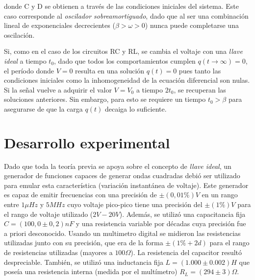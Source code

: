 \documentclass[11pt,a4paper]{article}
\begin{document}
donde C y D se obtienen a través de las condiciones iniciales del sistema. Este caso corresponde al \textit{oscilador sobreamortiguado}, dado que al ser una combinación lineal de exponenciales decrecientes ($\beta > \omega > 0$) nunca puede completarse una oscilación. 

Si, como en el caso de los circuitos RC y RL, se cambia el voltaje con una \textit{llave ideal} a tiempo $t_0$, dado que todos los comportamientos cumplen $q(t\rightarrow\infty) = 0$, el período donde $V = 0$ resulta en una solución $q(t) = 0$ pues tanto las condiciones iniciales como la inhomogeneidad de la ecuación diferencial son nulas. Si la señal vuelve a adquirir el valor $V = V_0$ a tiempo $2t_0$, se recuperan las soluciones anteriores. Sin embargo, para esto se requiere un tiempo $t_0 > \beta$ para asegurarse de que la carga $q(t)$ decaiga lo suficiente. 



\section{Desarrollo experimental}

Dado que toda la teoría previa se apoya sobre el concepto de \textit{llave ideal}, un generador de funciones capaces de generar ondas cuadradas debió ser utilizado para emular esta característica (variación instantánea de voltaje). Este generador es capaz de emitir frecuencias con una precisión de $\pm (0,01\%)V$ en un rango entre $1\mu Hz$ y $5MHz$ cuyo voltaje pico-pico tiene una precisión del $\pm (1\%)V$ para el rango de voltaje utilizado ($2V-20V$). Además, se utilizó una capacitancia fija $C = (100,0 \pm 0,2)nF$ y una resistencia variable por décadas cuya precisión fue a priori desconocido. Usando un multimetro digital se midieron las resistencias utilizadas junto con su precisión, que era de la forma $\pm(1\%+2d)$ para el rango de resistencias utilizadas (mayores a $100\Omega$). La resistencia del capacitor resultó despreciable. También, se utilizó una inductancia fija $L = (1.000 \pm 0.002) H$ que poseía una resistencia interna (medida por el multímetro) $R_L = (294 \pm 3) \Omega$.
\end{document}
